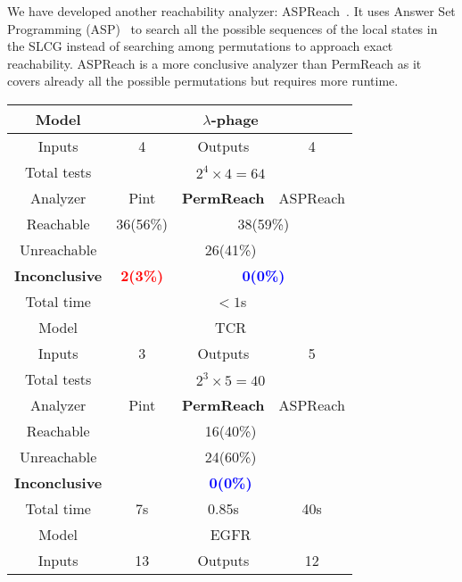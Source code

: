 \documentclass[runningheads]{llncs}
\begin{document}
We have developed another reachability analyzer: ASPReach~\cite{chai2018reach}. 
It uses Answer Set Programming (ASP)~\cite{baral2003knowledge} to search all the possible sequences of the local states in the SLCG instead of searching among permutations to approach exact reachability.
ASPReach is a more conclusive analyzer than PermReach as it covers already all the possible permutations but requires more runtime.

\begin{table}[ht]
\centering
    \begin{tabular}{|c|c|c|c|}
    \hline
     Model    &  \multicolumn{3}{c|}{$\lambda$-phage}\\
     \hline
     Inputs    & 4 & Outputs& 4\\%
     \hline
     Total tests&\multicolumn{3}{c|}{$2^4\times 4=64$}\\
     \hline
     Analyzer  &  Pint  &  \textbf{PermReach}   &ASPReach\\
     \hline
     Reachable & 36(56\%)& \multicolumn{2}{c|}{38(59\%)} \\
     \hline
     Unreachable&\multicolumn{3}{c|}{26(41\%)}\\
     \hline
     \textbf{Inconclusive} &\textcolor{red}{\textbf{2(3\%)}}&\multicolumn{2}{c|}{\textcolor{blue}{\textbf{0(0\%)}}}\\
     \hline
     Total time & \multicolumn{3}{c|}{$<1$s}\\
    \hline
     Model    &  \multicolumn{3}{c|}{TCR}\\
     \hline
     Inputs    & 3 & Outputs& 5\\
     \hline
     Total tests&\multicolumn{3}{c|}{$2^3\times 5=40$}\\
     \hline
     Analyzer  &  Pint  &  \textbf{PermReach}   &ASPReach\\
     \hline
     Reachable & \multicolumn{3}{c|}{16(40\%)} \\
     \hline
     Unreachable&\multicolumn{3}{c|}{24(60\%)} \\
     \hline
     \textbf{Inconclusive} &\multicolumn{3}{c|}{\textcolor{blue}{\textbf{0(0\%)}}} \\
     \hline
     Total time &  7s     &0.85s  &  40s        \\
    \hline
     Model    &  \multicolumn{3}{c|}{EGFR}\\
     \hline
     Inputs    & 13 & Outputs& 12\\
     \hline

\end{tabular}
\end{table}
\end{document}
